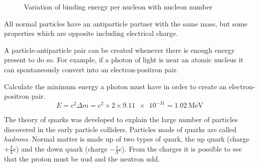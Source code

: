 \documentclass[revision-guide.tex]{subfiles}
\begin{document}
\begin{figure}[h]
  \begin{center}
  \end{center}
  \caption{Variation of binding energy per nucleon with nucleon number}
  \label{binding-energy}
\end{figure}


All normal particles have an antiparticle partner with the same mass, but some properties which are opposite including electrical charge.


A particle-antiparticle pair can be created whenever there is enough energy present to do so. For example, if a photon of light is near an atomic nucleus it can spontaneously convert into an electron-positron pair.

\begin{example}
  Calculate the minimum energy a photon must have in order to create an electron-positron pair.
  \answer
  \[ E = c^2 \Delta m = c^2 \times 2 \times\num{9.11e-31} = \SI{1.02}{\mega\electronvolt} \]
\end{example}


The theory of quarks was developed to explain the large number of particles discovered in the early particle colliders. Particles made of quarks are called \emph{hadrons}. Normal matter is made up of two types of quark, the up quark (charge $+\frac{2}{3}e$) and the down quark (charge $-\frac{1}{3}e$). From the charges it is possible to see that the proton must be uud and the neutron udd.
\end{document}

